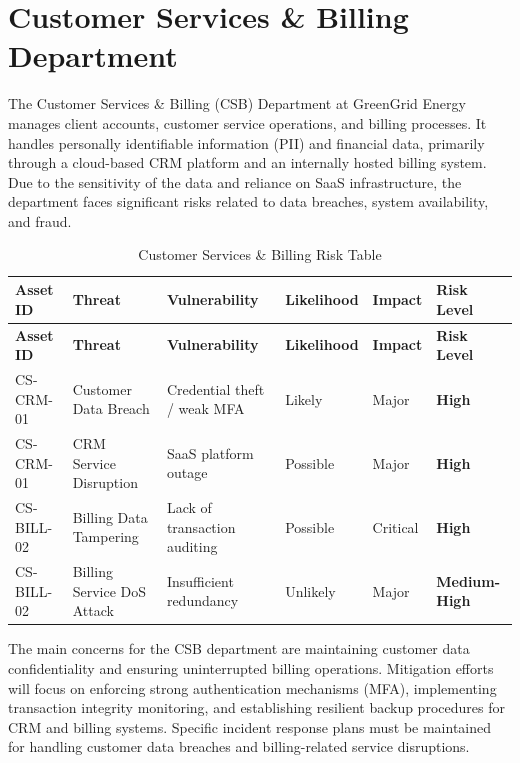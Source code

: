 \section{Customer Services \& Billing Department}

The Customer Services \& Billing (CSB) Department at GreenGrid Energy manages client accounts, customer service operations, and billing processes.
It handles personally identifiable information (\ac{PII}) and financial data, primarily through a cloud-based CRM platform and an internally hosted billing system.
Due to the sensitivity of the data and reliance on SaaS infrastructure, the department faces significant risks related to data breaches, system availability, and fraud.

\begin{longtable}{|p{2cm}|p{3cm}|p{3.5cm}|p{2cm}|p{2cm}|p{2cm}|}
  \caption{Customer Services \& Billing Risk Table}
  \label{tab:csb_risks}                                                                                                                        \\
  \hline
  \textbf{Asset ID} & \textbf{Threat}            & \textbf{Vulnerability}       & \textbf{Likelihood} & \textbf{Impact} & \textbf{Risk Level}  \\
  \hline
  \endfirsthead

  \hline
  \textbf{Asset ID} & \textbf{Threat}            & \textbf{Vulnerability}       & \textbf{Likelihood} & \textbf{Impact} & \textbf{Risk Level}  \\
  \hline
  \endhead

  \hline
  \endfoot

  CS-CRM-01         & Customer Data Breach       & Credential theft / weak MFA  & Likely              & Major           & \textbf{High}        \\
  \hline
  CS-CRM-01         & CRM Service Disruption     & SaaS platform outage         & Possible            & Major           & \textbf{High}        \\
  \hline
  CS-BILL-02        & Billing Data Tampering     & Lack of transaction auditing & Possible            & Critical        & \textbf{High}        \\
  \hline
  CS-BILL-02        & Billing Service DoS Attack & Insufficient redundancy      & Unlikely            & Major           & \textbf{Medium-High} \\
  \hline
\end{longtable}

The main concerns for the CSB department are maintaining customer data confidentiality and ensuring uninterrupted billing operations.
Mitigation efforts will focus on enforcing strong authentication mechanisms (MFA), implementing transaction integrity monitoring, and establishing resilient backup procedures for CRM and billing systems.
Specific incident response plans must be maintained for handling customer data breaches and billing-related service disruptions.
